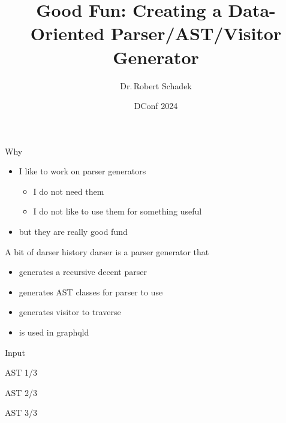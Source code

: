 \documentclass[aspectratio=169,notes]{beamer}
\title{Good Fun: Creating a Data-Oriented Parser/AST/Visitor Generator}
\date{DConf 2024}
\author{Dr.\,Robert Schadek}
\begin{document}
	\maketitle

	\begin{frame}[fragile]{Why}
		\begin{itemize}
			\item I like to work on parser generators
			\pause
			\begin{itemize}
				\item I do not need them
				\item I do not like to use them for something useful
			\end{itemize}
			\item but they are really good fund
		\end{itemize}
	\end{frame}

	\begin{frame}[fragile]{A bit of darser history}
		darser is a parser generator that
		\begin{itemize}
			\item generates a recursive decent parser
			\item generates AST classes for parser to use
			\item generates visitor to traverse
			\item is used in graphqld
		\end{itemize}
	\end{frame}

	\begin{frame}[fragile]{Input}
		
	\end{frame}

	\begin{frame}[fragile]{AST 1/3}
		
	\end{frame}

	\begin{frame}[fragile]{AST 2/3}
		
	\end{frame}

	\begin{frame}[fragile]{AST 3/3}
		
	\end{frame}
\end{document}
